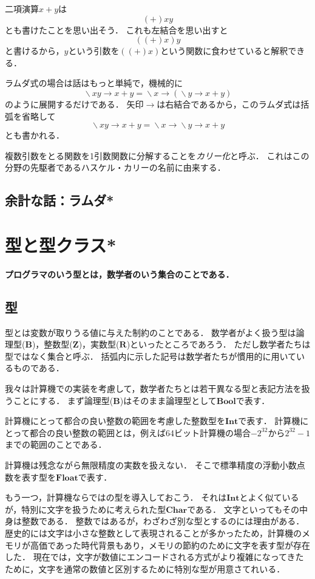 \documentclass[twocolumn]{jsbook}
\newcommand{\keyword}[1]{\emph{#1}}
\newenvironment{leader}{\begingroup\bf}{\endgroup}
\newcommand{\hsklType}[1]{\textbf{#1}}
\newcommand{\hsklBool}{\hsklType{Bool}}
\newcommand{\hsklChar}{\hsklType{Char}}
\newcommand{\hsklInt}{\hsklType{Int}}
\newcommand{\hsklFloat}{\hsklType{Float}}
\DeclareMathOperator{\mathLambda}{\backslash}
\newcommand{\mathLambdaArrow}{\rightarrow}
\newcommand{\mathSet}[1]{\mathbf{#1}}
\newcommand{\mathLambdaExpression}[2]{\mathLambda#1\mathLambdaArrow#2}
\begin{document}
二項演算$x+y$は$$(+)xy$$とも書けたことを思い出そう．
これも左結合を思い出すと$$((+)x)y$$と書けるから，$y$という引数を$((+)x)$という関数に食わせていると解釈できる．

ラムダ式の場合は話はもっと単純で，機械的に$$\mathLambdaExpression{xy}{x+y}=\mathLambdaExpression{x}{(\mathLambdaExpression{y}{x+y})}$$のように展開するだけである．
矢印$\mathLambdaArrow$は右結合であるから，このラムダ式は括弧を省略して$$\mathLambdaExpression{xy}{x+y}=\mathLambdaExpression{x}{\mathLambdaExpression{y}{x+y}}$$とも書かれる．

複数引数をとる関数を1引数関数に分解することを\keyword{カリー化}と呼ぶ．
これはこの分野の先駆者であるハスケル・カリーの名前に由来する．

\section*{余計な話：ラムダ*}


\chapter{型と型クラス*}

\begin{leader}
プログラマのいう型とは，数学者のいう集合のことである．
\end{leader}


\section{型}

型とは変数が取りうる値に与えた制約のことである．
数学者がよく扱う型は論理型($\mathSet{B}$)，整数型($\mathSet{Z}$)，実数型($\mathSet{R}$)といったところであろう．
ただし数学者たちは型ではなく集合と呼ぶ．
括弧内に示した記号は数学者たちが慣用的に用いているものである．

我々は計算機での実装を考慮して，数学者たちとは若干異なる型と表記方法を扱うことにする．
まず論理型($\mathSet{B}$)はそのまま論理型として$\hsklBool$で表す．

計算機にとって都合の良い整数の範囲を考慮した整数型を$\hsklInt$で表す．
計算機にとって都合の良い整数の範囲とは，例えば64ビット計算機の場合$-2^{32}$から$2^{32}-1$までの範囲のことである．

計算機は残念ながら無限精度の実数を扱えない．
そこで標準精度の浮動小数点数を表す型を$\hsklFloat$で表す．

もう一つ，計算機ならではの型を導入しておこう．
それは$\hsklInt$とよく似ているが，特別に文字を扱うために考えられた型$\hsklChar$である．
文字といってもその中身は整数である．
整数ではあるが，わざわざ別な型とするのには理由がある．
歴史的には文字は小さな整数として表現されることが多かったため，計算機のメモリが高価であった時代背景もあり，メモリの節約のために文字を表す型が存在した．
現在では，文字が数値にエンコードされる方式がより複雑になってきたために，文字を通常の数値と区別するために特別な型が用意さてれいる．
\end{document}
